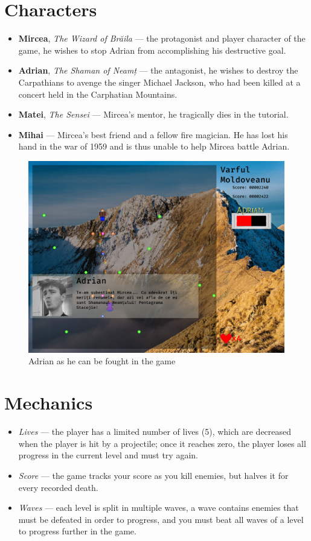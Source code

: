 \documentclass{article}
\begin{document}
    \section{Characters}
    \begin{itemize}
        \item \textbf{Mircea}, \emph{The Wizard of Brăila} --- the protagonist and player character
        of the game, he wishes to stop Adrian from accomplishing his destructive goal.
        \item \textbf{Adrian}, \emph{The Shaman of Neamț} --- the antagonist, he wishes to
        destroy the Carpathians to avenge the singer Michael Jackson, who had been killed at a concert
        held in the Carphatian Mountains.
        \item \textbf{Matei}, \emph{The Sensei} --- Mircea's mentor, he tragically dies in the tutorial.
        \item \textbf{Mihai} --- Mircea's best friend and a fellow fire magician. He has lost his hand
        in the war of 1959 and is thus unable to help Mircea battle Adrian.
    \end{itemize}
    \begin{figure}[h]
        \includegraphics[width=\linewidth]{adrian}
        \caption{Adrian as he can be fought in the game}
    \end{figure}

    \section{Mechanics}
    \begin{itemize}
        \item \emph{Lives} --- the player has a limited number of lives (5), which are decreased when
        the player is hit by a projectile; once it reaches zero, the player loses all progress in the
        current level and must try again.
        \item \emph{Score} --- the game tracks your score as you kill enemies, but halves it for every
        recorded death.
        \item \emph{Waves} --- each level is split in multiple waves, a wave contains enemies that must
        be defeated in order to progress, and you must beat all waves of a level to progress further in
        the game.
    \end{itemize}
\end{document}
